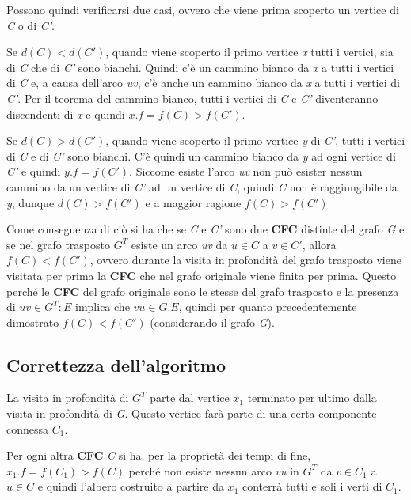 Possono quindi verificarsi due casi, ovvero che viene prima scoperto un
vertice di \emph{C} o di \emph{C'}.

Se $d(C) < d(C')$, quando viene scoperto il primo vertice
\emph{x} tutti i vertici, sia di \emph{C} che di \emph{C'} sono bianchi.
Quindi c'è un cammino bianco da \emph{x} a tutti i vertici di \emph{C}
e, a causa dell'arco \emph{uv}, c'è anche un cammino bianco da \emph{x}
a tutti i vertici di \emph{C'}. Per il teorema del cammino bianco, tutti
i vertici di \emph{C} e \emph{C'} diventeranno discendenti di \emph{x} e
quindi $x.f = f(C) > f(C')$.

Se $ d(C) > d(C') $, quando viene scoperto il primo vertice \textit{y} di \textit{C'}, tutti i vertici di \textit{C} e di \textit{C'} sono bianchi.
C'è quindi un cammino bianco da \textit{y} ad ogni vertice di \textit{C'} e quindi $ y.f = f(C') $.
Siccome esiste l'arco \textit{uv} non può esister nessun cammino da un vertice di \textit{C'} ad un vertice di \textit{C}, quindi \textit{C} non è raggiungibile da \textit{y}, dunque $ d(C) > f(C') $ e a maggior ragione $ f(C) > f(C') $

Come conseguenza di ciò si ha che se \textit{C} e \textit{C'} sono due \textbf{CFC} distinte del grafo \textit{G} e se nel grafo trasposto $ G^T $ esiste un arco \textit{uv} da $ u \in C$ a $ v \in C' $, allora $ f(C) < f(C') $, ovvero durante la visita in profondità del grafo trasposto viene visitata per prima la \textbf{CFC} che nel grafo originale viene finita per prima.
Questo perché le \textbf{CFC} del grafo originale sono le stesse del grafo trasposto e la presenza di $ uv \in G^T:E $ implica che $ vu \in G.E$, quindi per quanto precedentemente dimostrato $ f(C) < f(C') $ (considerando il grafo \textit{G}).

\subsection{Correttezza dell'algoritmo}\label{correttezza-dellalgoritmo}

La visita in profondità di $G^T$ parte dal vertice $x_1$
terminato per ultimo dalla visita in profondità di \emph{G}. Questo
vertice farà parte di una certa componente connessa $C_1$.

Per ogni altra \textbf{CFC} \emph{C} si ha, per la proprietà dei tempi
di fine, $x_1.f = f(C_1) > f(C)$ perché non esiste
nessun arco \emph{vu} in $G^T$ da $v \in C_1$ a $u \in C$ e quindi l'albero costruito a partire da $x_1$ conterrà tutti e
soli i verti di $C_1$.

